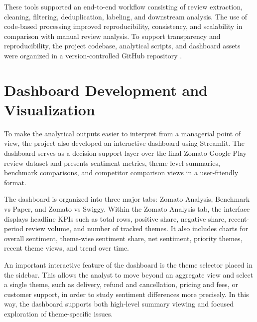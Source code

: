These tools supported an end-to-end workflow consisting of review extraction, cleaning, filtering, deduplication, labeling, and downstream analysis. The use of code-based processing improved reproducibility, consistency, and scalability in comparison with manual review analysis. To support transparency and reproducibility, the project codebase, analytical scripts, and dashboard assets were organized in a version-controlled GitHub repository \cite{zomatorepo2026}.

\section{Dashboard Development and Visualization}

To make the analytical outputs easier to interpret from a managerial point of view, the project also developed an interactive dashboard using Streamlit. The dashboard serves as a decision-support layer over the final Zomato Google Play review dataset and presents sentiment metrics, theme-level summaries, benchmark comparisons, and competitor comparison views in a user-friendly format.

The dashboard is organized into three major tabs: Zomato Analysis, Benchmark vs Paper, and Zomato vs Swiggy. Within the Zomato Analysis tab, the interface displays headline KPIs such as total rows, positive share, negative share, recent-period review volume, and number of tracked themes. It also includes charts for overall sentiment, theme-wise sentiment share, net sentiment, priority themes, recent theme views, and trend over time.

An important interactive feature of the dashboard is the theme selector placed in the sidebar. This allows the analyst to move beyond an aggregate view and select a single theme, such as delivery, refund and cancellation, pricing and fees, or customer support, in order to study sentiment differences more precisely. In this way, the dashboard supports both high-level summary viewing and focused exploration of theme-specific issues.



